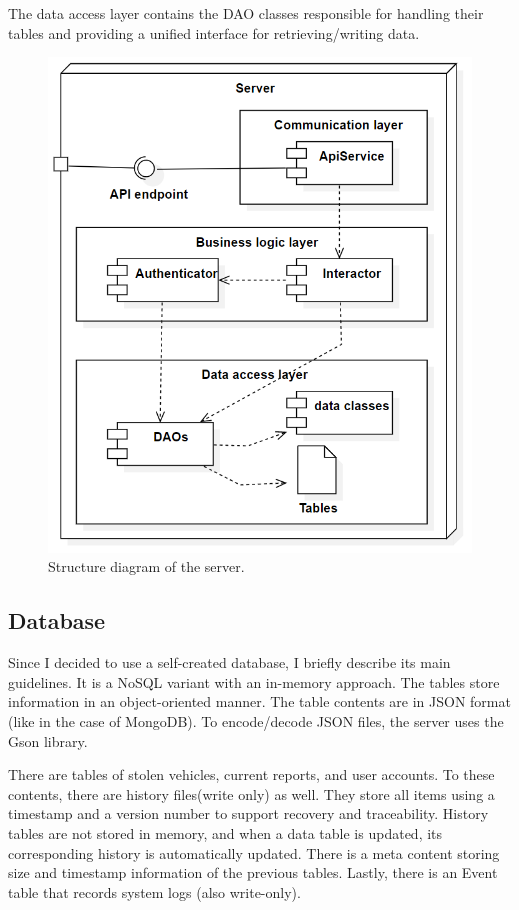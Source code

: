 The data access layer contains the DAO classes responsible for handling their tables and providing a unified interface for retrieving/writing data.

\begin{figure}[htb]
 \centerline{\includegraphics[width=.85\columnwidth]{.//Figure/System/ServerStructure.PNG}}
 \caption{Structure diagram of the server.}
 \label{fig:simple}
\end{figure}

\subsection{Database}

Since I decided to use a self-created database, I briefly describe its main guidelines. It is a NoSQL variant with an in-memory approach. The tables store information in an object-oriented manner. The table contents are in JSON format (like in the case of MongoDB). To encode/decode JSON files, the server uses the Gson library.

There are tables of stolen vehicles, current reports, and user accounts. To these contents, there are history files(write only) as well. They store all items using a timestamp and a version number to support recovery and traceability. History tables are not stored in memory, and when a data table is updated, its corresponding history is automatically updated. There is a meta content storing size and timestamp information of the previous tables. Lastly, there is an Event table that records system logs (also write-only).

